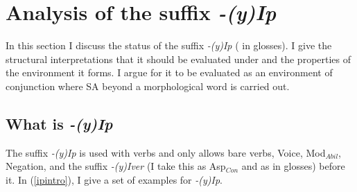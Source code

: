 \section{Analysis of the suffix \textit{-(y)Ip}} 

In this section I discuss the status of the suffix \textit{-(y)Ip} ({\Pc} in glosses). I give the structural interpretations that it should be evaluated under and the properties of the environment it forms. I argue for it to be evaluated as an environment of conjunction where SA beyond a morphological word is carried out.

\subsection{What is \textit{-(y)Ip}}

The suffix \textit{-(y)Ip} is used with verbs and only allows bare verbs, Voice, Mod$_{Abil}$, Negation, and the  suffix \textit{-(y)Iver} (I take this as Asp$_{Con}$ \cite{cinque1999adverbs} and as {\Con} in glosses) before it.  In (\ref{ipintro}), I give a set of examples for \textit{-(y)Ip}.

